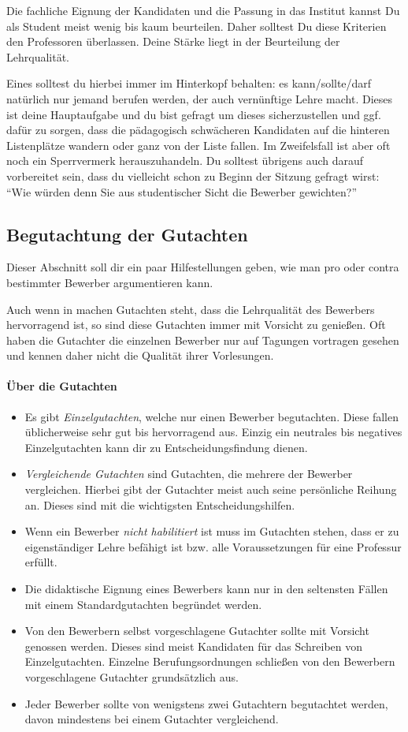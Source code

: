 \documentclass[10pt,twoside,a5paper,openright]{book}
\begin{document}
Die fachliche Eignung der Kandidaten und die Passung in das Institut kannst Du als Student meist wenig bis kaum beurteilen. Daher solltest Du diese Kriterien den Professoren überlassen. Deine Stärke liegt in der Beurteilung der Lehrqualität.

Eines solltest du hierbei immer im Hinterkopf behalten: es kann/sollte/darf natürlich nur jemand berufen werden, der auch vernünftige Lehre macht. Dieses ist deine Hauptaufgabe und du bist gefragt um dieses sicherzustellen und ggf. dafür zu sorgen, dass die pädagogisch schwächeren Kandidaten auf die hinteren Listenplätze wandern oder ganz von der Liste fallen. Im Zweifelsfall ist aber oft noch ein Sperrvermerk herauszuhandeln. Du solltest übrigens auch darauf vorbereitet sein, dass du vielleicht schon zu Beginn der Sitzung gefragt wirst: "`Wie würden denn Sie aus studentischer Sicht die Bewerber gewichten?"'


\subsection{Begutachtung der Gutachten}
Dieser Abschnitt soll dir ein paar Hilfestellungen geben, wie man pro oder contra bestimmter Bewerber argumentieren kann.

Auch wenn in machen Gutachten steht, dass die Lehrqualität des Bewerbers hervorragend ist, so sind diese Gutachten immer mit Vorsicht zu genießen. Oft haben die Gutachter die einzelnen Bewerber nur auf Tagungen vortragen gesehen und kennen daher nicht die Qualität ihrer Vorlesungen.

\paragraph{Über die Gutachten}
\begin{itemize}
	\item Es gibt \emph{Einzelgutachten}, welche nur einen Bewerber begutachten. Diese fallen üblicherweise sehr gut bis hervorragend aus. Einzig ein neutrales bis negatives Einzelgutachten kann dir zu Entscheidungsfindung dienen.
	\item \emph{Vergleichende Gutachten} sind Gutachten, die mehrere der Bewerber vergleichen. Hierbei gibt der Gutachter meist auch seine persönliche Reihung an. Dieses sind mit die wichtigsten Entscheidungshilfen.
	\item Wenn ein Bewerber \emph{nicht habilitiert} ist muss im Gutachten stehen, dass er zu eigenständiger Lehre befähigt ist bzw. alle Voraussetzungen für eine Professur erfüllt.
	\item Die didaktische Eignung eines Bewerbers kann nur in den seltensten Fällen mit einem Standardgutachten begründet werden.
	\item Von den Bewerbern selbst vorgeschlagene Gutachter sollte mit Vorsicht genossen werden. Dieses sind meist Kandidaten für das Schreiben von Einzelgutachten. Einzelne Berufungsordnungen schließen von den Bewerbern vorgeschlagene Gutachter grundsätzlich aus.
	\item Jeder Bewerber sollte von wenigstens zwei Gutachtern begutachtet werden, davon mindestens bei einem Gutachter vergleichend.
\end{itemize}
\end{document}
